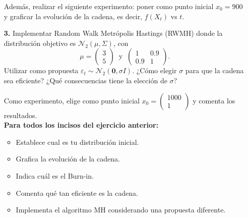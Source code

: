 \documentclass[letterpaper]{article}
\newcommand{\1}{\mathds{1}}
\theoremstyle{definition}
\theoremstyle{definition}
\theoremstyle{definition}
\theoremstyle{definition}
\theoremstyle{definition}
\begin{document}
\begin{itemize}
    Además, realizar el siguiente experimento: poner como punto inicial $x_0=900$ y graficar 
    la evolución de la cadena, es decir, $f(X_t)$ vs $t$.
    \item[\textbf{3.}] Implementar Random Walk Metrópolis Hastings (RWMH) donde la distribución
    objetivo es $\mathcal{N}_2(\mu,\Sigma)$, con 
    \[
    \mu=\begin{pmatrix}
        3\\
        5
    \end{pmatrix} \ \text{ y } \ 
    \begin{pmatrix}
        1 & 0.9\\
        0.9 & 1
    \end{pmatrix}.    
    \]
    Utilizar como propuesta $\varepsilon_t\sim \mathcal{N}_2(\textbf{0},\sigma I)$. ¿Cómo elegir 
    $\sigma$ para que la cadena sea eficiente? ¿Qué consecuencias tiene la elección de $\sigma$?

    Como experimento, elige como punto inicial $x_0= \begin{pmatrix}
        1000\\
        1
    \end{pmatrix}$ y comenta los resultados.\\

    \textbf{Para todos los incisos del ejercicio anterior:}
    \begin{itemize}
        \item Establece cual es tu distribución inicial.
        \item Grafica la evolución de la cadena.
        \item Indica cuál es el Burn-in.
        \item Comenta qué tan eficiente es la cadena.
        \item Implementa el algoritmo MH considerando una propuesta diferente.
    \end{itemize}
\end{itemize}
\end{document}
